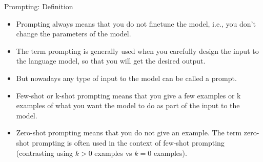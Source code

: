 \documentclass[11pt,compress,t,notes=noshow, xcolor=table]{beamer}
\def\myblue#1{\textcolor{texblue}{#1}}
\begin{document}
\def\myblue#1{\textcolor{texblue}{#1}}

\begin{frame}{Prompting: Definition}

\vfill

\begin{itemize}

\item Prompting always means that you \myblue{do not finetune the model},
i.e., you don't change the parameters of the model.

\item The term prompting is generally used when you \myblue{carefully design the
input to the language model}, so that you will get the
desired output.

\item \myblue{But nowadays any type of input to the model can be called
a prompt.}

\item \myblue{Few-shot or k-shot prompting} means that you give a few
examples or k examples of what you want the model to do
as part of the input to the model.

\item \myblue{Zero-shot prompting} means that you do not give an example.
The term zero-shot prompting is often used in the context of
few-shot prompting (contrasting using $k>0$ examples vs $k=0$
examples).

\end{itemize}

\vfill

\end{frame}

\endlecture
\end{document}
